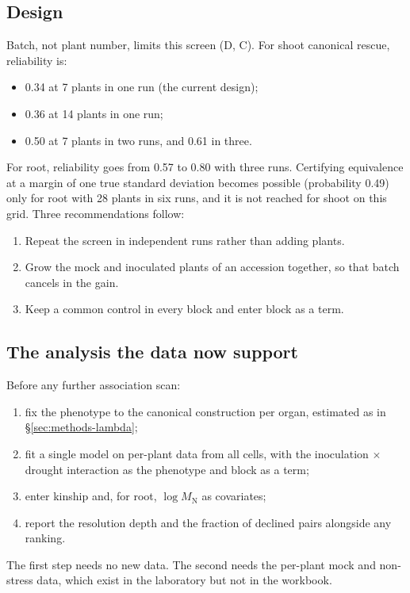 \documentclass[10pt,twocolumn,a4paper]{article}
\theoremstyle{definition}
\theoremstyle{remark}
\newcommand{\MN}{{M_{\mathrm N}}}
\begin{document}
\subsection{Design}

Batch, not plant number, limits this screen (D,
C). For shoot canonical rescue, reliability is:
\begin{itemize}[leftmargin=1.3em,itemsep=1pt]
  \item 0.34 at 7 plants in one run (the current design);
  \item 0.36 at 14 plants in one run;
  \item 0.50 at 7 plants in two runs, and 0.61 in three.
\end{itemize}
For root, reliability goes from 0.57 to 0.80 with three runs.
Certifying equivalence at a margin of one true standard deviation becomes
possible (probability 0.49) only for root with 28 plants in six runs, and
it is not reached for shoot on this grid. Three recommendations follow:
\begin{enumerate}[label=(\roman*),leftmargin=1.8em,itemsep=1pt]
  \item Repeat the screen in independent runs rather than adding plants.
  \item Grow the mock and inoculated plants of an accession together, so
  that batch cancels in the gain.
  \item Keep a common control in every block and enter block as a term.
\end{enumerate}

\subsection{The analysis the data now support}

Before any further association scan:
\begin{enumerate}[label=(\arabic*),leftmargin=1.8em,itemsep=1pt]
  \item fix the phenotype to the canonical construction per organ,
  estimated as in \S\ref{sec:methods-lambda};
  \item fit a single model on per-plant data from all cells, with the
  inoculation $\times$ drought interaction as the phenotype and block as
  a term;
  \item enter kinship \citep{yu2006,kang2010} and, for root, $\log\MN$ as
  covariates;
  \item report the resolution depth and the fraction of declined pairs
  alongside any ranking.
\end{enumerate}
The first step needs no new data. The second needs the per-plant mock
and non-stress data, which exist in the laboratory but not in the
workbook.
\end{document}
